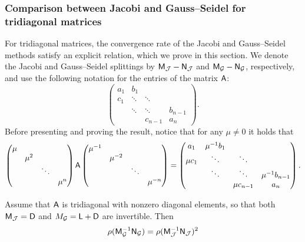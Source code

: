\subsubsection{Comparison between Jacobi and Gauss--Seidel for tridiagonal matrices~\moreinfo}%
\label{ssub:comparison_between_jacobi_and_gauss_seidel_for_tridiagonal_matrices}
For tridiagonal matrices,
the convergence rate of the Jacobi and Gauss--Seidel methods satisfy an explicit relation,
which we prove in this section.
We denote the Jacobi and Gauss--Seidel splittings by $\mathsf M_{\mathcal J} - \mathsf N_{\mathcal J}$ and  $\mathsf M_{\mathcal G} - \mathsf N_{\mathcal G}$,
respectively,
and use the following notation for the entries of the matrix $\mathsf A$:
\[
    \begin{pmatrix}
        a_1 & b_1 \\
        c_1 & \ddots & \ddots  \\
             & \ddots & \ddots & b_{n-1} \\
             & & c_{n-1} & a_n
    \end{pmatrix}.
\]
Before presenting and proving the result,
notice that for any $\mu \neq 0$ it holds that
\begin{equation}
    \label{eq:preliminary_equation}
    \begin{pmatrix}
        \mu \\
        & \mu^{2} &  \\
        & & \ddots & \\
        & & & \mu^{n}
    \end{pmatrix}
    \mathsf A
    \begin{pmatrix}
        \mu^{-1}  \\
        & \mu^{-2} &  \\
        & & \ddots & \\
        & & & \mu^{-n}
    \end{pmatrix}
    =
    \begin{pmatrix}
        a_1 & \mu^{-1} b_1 \\
        \mu c_1 & \ddots & \ddots  \\
             & \ddots & \ddots & \mu^{-1} b_{n-1} \\
             & & \mu c_{n-1} & a_n
    \end{pmatrix}.
\end{equation}
\begin{proposition}
    Assume that $\mathsf A$ is tridiagonal with nonzero diagonal elements,
    so that both $\mathsf M_{\mathcal J} = \mathsf D$ and $\mathsf {\mathsf} M_{\mathcal G} = \mathsf L + \mathsf D$ are invertible.
    Then
    \[
        \rho(\mathsf M_{\mathcal G}^{-1} \mathsf N_{\mathcal  G})
        = \rho(\mathsf M_{\mathcal J}^{-1} \mathsf N_{\mathcal  J})^2
    \]
\end{proposition}
